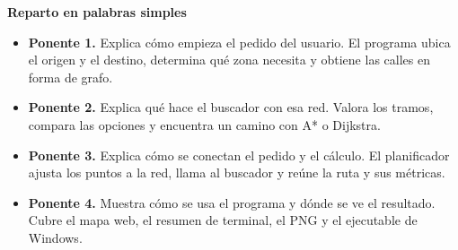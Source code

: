 \documentclass[11pt,a4paper]{article}
\begin{document}
\bigskip
\noindent\textbf{Reparto en palabras simples}
\begin{itemize}
\item \textbf{Ponente 1.} Explica cómo empieza el pedido del usuario. El programa ubica el origen y el destino, determina qué zona necesita y obtiene las calles en forma de grafo.
\item \textbf{Ponente 2.} Explica qué hace el buscador con esa red. Valora los tramos, compara las opciones y encuentra un camino con A* o Dijkstra.
\item \textbf{Ponente 3.} Explica cómo se conectan el pedido y el cálculo. El planificador ajusta los puntos a la red, llama al buscador y reúne la ruta y sus métricas.
\item \textbf{Ponente 4.} Muestra cómo se usa el programa y dónde se ve el resultado. Cubre el mapa web, el resumen de terminal, el PNG y el ejecutable de Windows.
\end{itemize}
\end{document}
